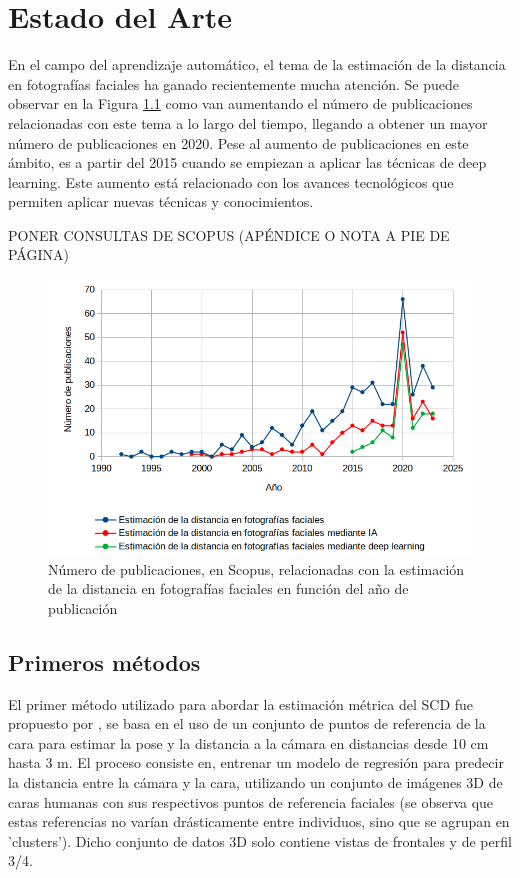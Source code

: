 \chapter{Estado del Arte}
\thispagestyle{empty}

En el campo del aprendizaje automático, el tema de la estimación de la distancia en fotografías faciales ha ganado recientemente mucha atención. Se puede observar en la Figura \ref{fig5} como van aumentando el número de publicaciones relacionadas con este tema a lo largo del tiempo, llegando a obtener un mayor número de publicaciones en 2020. Pese al aumento de publicaciones en este ámbito, es a partir del 2015 cuando se empiezan a aplicar las técnicas de deep learning. Este aumento está relacionado con los avances tecnológicos que permiten aplicar nuevas técnicas y conocimientos. 

PONER CONSULTAS DE SCOPUS (APÉNDICE O NOTA A PIE DE PÁGINA)

\begin{figure}[h]
	\centering
	\includegraphics[scale=0.5]{imagenes/cap3/grafica_scopus3.png}
	\caption{Número de publicaciones, en Scopus, relacionadas con la estimación de la distancia en fotografías faciales en función del año de publicación}
	\label{fig5}
\end{figure}

\section{Primeros métodos}

El primer método utilizado para abordar la estimación métrica del SCD fue propuesto por \cite{28}, se basa en el uso de un conjunto de puntos de referencia de la cara para estimar la pose y la distancia a la cámara en distancias desde 10 cm hasta 3 m. El proceso consiste en, entrenar un modelo de regresión para predecir la distancia entre la cámara y la cara, utilizando un conjunto de imágenes 3D de caras humanas con sus respectivos puntos de referencia faciales (se observa que estas referencias no varían drásticamente entre individuos, sino que se agrupan en 'clusters'). Dicho conjunto de datos 3D solo contiene vistas de frontales y de perfil 3/4. 

